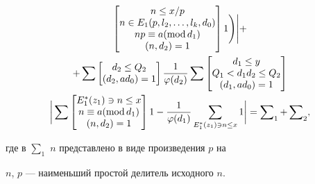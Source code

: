 \begin{multline*}
\begin{bmatrix}
n \le x/p\\


n\in E_1(p,l_2,\dotsc,l_k,d_0)\\


np \equiv a (\Mod d_1)\\


(n,d_2)=1


\end{bmatrix} 1 \Bigg) \Bigg |+\\


%


+ \sum 


\begin{bmatrix}


d_2 \le Q_2 \\ (d_2,ad_0)=1


\end{bmatrix} 


\frac1{\varphi(d_2)}


\sum 


\begin{bmatrix}


d_1 \le y\\


Q_1 < d_1 d_2 \le Q_2\\


(d_1,ad_0)=1


\end{bmatrix} \\


%


\bigg |


\sum 


\begin{bmatrix}


E^\ast_1(z_1) \ni n \le x\\


n \equiv a (\Mod d_1)\\


(n, d_2)=1


\end{bmatrix} 


1- \frac1{\varphi(d_1)} \sum_{E^\ast_1(z_1) \ni n \le x} 1 \bigg|


= \sum\nolimits_1 + \sum\nolimits_2,


\end{multline*}


где в $\sum_1$\; $n$ представлено в виде произведения $p$ на


$n$, $p$ --- наименьший простой делитель исходного $n$.





